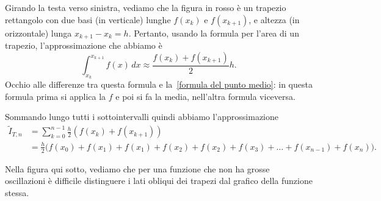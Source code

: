 \documentclass[a4paper]{report}
\theoremstyle{definiton}
\theoremstyle{remark}
\newcommand{\x}{\mathbf{x}}
\begin{document}
\begin{center}
    \end{center}
Girando la testa verso sinistra, vediamo che la figura in rosso è un trapezio rettangolo con due basi (in verticale) lunghe $f(x_k)$ e $f(x_{k+1})$, e altezza (in orizzontale) lunga $x_{k+1}-x_k = h$. Pertanto, usando la formula per l'area di un trapezio, l'approssimazione che abbiamo è
\begin{equation} \label{trapezi semplice}
    \int_{x_k}^{x_{k+1}} f(x)\, dx \approx \frac{f(x_k)+f(x_{k+1})}{2}h.
\end{equation}
Occhio alle differenze tra questa formula e la~\eqref{formula del punto medio}: in questa formula prima si applica la $f$ e poi si fa la media, nell'altra formula viceversa.

Sommando lungo tutti i sottointervalli quindi abbiamo l'approssimazione
\begin{align*}
    \tilde{I}_{T,n} &= \sum_{k=0}^{n-1 }\frac{h}{2}(f(x_k)+f(x_{k+1}))\\
    &= \frac{h}{2}\biggl(f(x_0)+f(x_1) + f(x_1)+f(x_2) + f(x_2)+f(x_3) + \dots + f(x_{n-1})+f(x_n)\biggr).    
\end{align*}

Nella figura qui sotto, vediamo che per una funzione che non ha grosse oscillazioni è difficile distinguere i lati obliqui dei trapezi dal grafico della funzione stessa.
\end{document}
